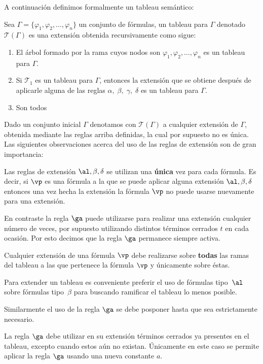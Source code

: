 \documentclass[11pt,letterpaper]{article}
\begin{document}
A continuación definimos formalmente un tableau semántico:

 \begin{definicion}
 Sea $\Gamma = \{\varphi_{1},\varphi_{2},\ldots , \varphi_{n}\}$ un conjunto de
 fórmulas, un tableau para $\Gamma$ denotado $\mathcal{T}(\Gamma)$ es una 
 extensión obtenida recursivamente como sigue:
 \begin{enumerate}
 \item El árbol formado por la rama cuyos nodos son $\varphi_{1}, \varphi_{2},
   \ldots , \varphi_{n}$ es un tableau para $\Gamma$.

 \item Si $\mathcal{T}_{1}$ es un  tableau para $\Gamma$, entonces la extensión
   que se obtiene después de aplicarle alguna de las reglas $\alpha,\;
   \beta,\;\gamma,\;\delta$ es un tableau para $\Gamma$.

   \item Son todos 
 \end{enumerate}
\end{definicion}

Dado un conjunto inicial $\Gamma$ denotamos con $\mathcal{T}(\Gamma)$ a
cualquier extensión de $\Gamma$, obtenida mediante las reglas arriba 
definidas, la cual por supuesto no es única. \\
Las siguientes observaciones acerca del uso de las reglas de extensión son de 
gran importancia:

\bi
 \item Las reglas de extensión $\al,\beta,\delta$ se utilizan una 
  \textbf{única} vez para cada fórmula. Es decir, si $\vp$ es una fórmula a la 
  que se puede aplicar alguna extensión $\al,\beta,\delta$ entonces una vez 
  hecha la extensión la fórmula $\vp$ no puede usarse nuevamente para una 
  extensión. 
 \item En contraste la regla $\ga$ puede utilizarse para realizar una extensión 
  cualquier número de veces, por supuesto utilizando distintos términos 
  cerrados $t$ en cada ocasión. Por esto decimos que la regla $\ga$ permanece 
  siempre activa.
 \item Cualquier extensión de una fórmula $\vp$ debe realizarse sobre 
  \textbf{todas} las ramas del tableau a las que pertenece la fórmula $\vp$ y 
  únicamente sobre éstas.
 \item Para extender un tableau es conveniente preferir el uso de fórmulas 
  tipo~$\al$ sobre fórmulas tipo~$\beta$ para buscando ramificar el tableau lo menos posible.
 \item Similarmente el uso de la regla $\ga$ se debe posponer hasta que sea 
  estrictamente necesario.
 \item La regla $\ga$ debe utilizar en su extensión términos cerrados ya 
  presentes en el tableau, excepto cuando estos aún no existan. Únicamente en 
  este caso se permite aplicar la regla $\ga$ usando una nueva constante $a$.
\ei
\end{document}
